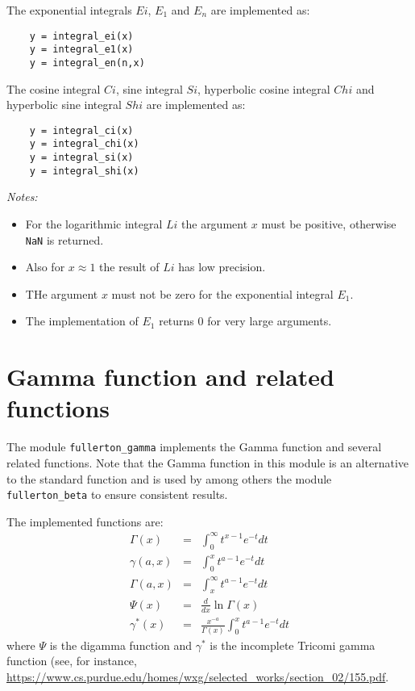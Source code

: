\documentclass{article}
\begin{document}
The exponential integrals $Ei$, $E_1$ and $E_n$ are implemented as:

\begin{verbatim}
    y = integral_ei(x)
    y = integral_e1(x)
    y = integral_en(n,x)
\end{verbatim}

The cosine integral $Ci$, sine integral $Si$, hyperbolic cosine integral $Chi$ and
hyperbolic sine integral $Shi$ are implemented as:

\begin{verbatim}
    y = integral_ci(x)
    y = integral_chi(x)
    y = integral_si(x)
    y = integral_shi(x)
\end{verbatim}

\emph{Notes:}
\begin{itemize}
\item
For the logarithmic integral $Li$ the argument $x$ must be positive, otherwise \verb+NaN+ is returned.
\item
Also for $x \approx 1$ the result of $Li$ has low precision.
\item
THe argument $x$ must not be zero for the exponential integral $E_1$.
\item
The implementation of $E_1$ returns 0 for very large arguments.
\end{itemize}


\section{Gamma function and related functions}
The module \verb+fullerton_gamma+ implements the Gamma function and several related functions. Note that
the Gamma function in this module is an alternative to the standard function and is used by among others the
module \verb+fullerton_beta+ to ensure consistent results.

The implemented functions are:
\begin{eqnarray}
    \Gamma(x)   &=& \int^\infty_0 t^{x-1} e^{-t} dt \\
    \gamma(a,x) &=& \int^x_0 t^{a-1} e^{-t} dt      \\
    \Gamma(a,x) &=& \int^\infty_x t^{a-1} e^{-t} dt \\
    \Psi(x)     &=& \frac{d}{dx} \ln \Gamma(x)      \\
    \gamma^*(x) &=& \frac{x^{-a}}{\Gamma(x)} \int^x_0 t^{a-1} e^{-t} dt
\end{eqnarray}
\noindent where $\Psi$ is the digamma function and $\gamma^*$ is the incomplete Tricomi gamma function (see, for instance,
\url{https://www.cs.purdue.edu/homes/wxg/selected_works/section_02/155.pdf}.
\end{document}
